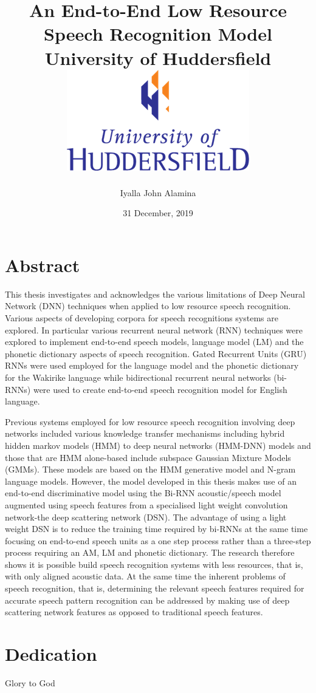 \documentclass[12pt,twoside]{report}
\title{
    {An End-to-End Low Resource Speech Recognition Model}\\
    {\large University of Huddersfield}\\
    {\includegraphics{university.png}}
}
\author{Iyalla John Alamina}
\date{31 December, 2019}
\begin{document}
\maketitle
{}

\chapter*{Abstract}
This thesis investigates and acknowledges the various limitations of Deep Neural Network (DNN) techniques when applied to low resource speech recognition.   Various aspects of developing corpora for speech recognitions systems are explored.  In particular various recurrent neural network (RNN) techniques were explored to implement end-to-end speech models, language model (LM) and the phonetic dictionary aspects of speech recognition. Gated Recurrent Units (GRU) RNNs were used employed for the language model and the phonetic dictionary for the Wakirike language while bidirectional recurrent neural networks (bi-RNNs) were used to create end-to-end speech recognition model for English language.

Previous systems employed for low resource speech recognition involving deep networks included various knowledge transfer mechanisms including hybrid hidden markov models (HMM) to deep neural networks (HMM-DNN) models and those that are HMM alone-based include subspace Gaussian Mixture Models (GMMs).   These models are based on the HMM generative model and N-gram language models.  However, the model developed in this thesis makes use of an end-to-end discriminative model using the Bi-RNN acoustic/speech model augmented using speech features from a specialised light weight convolution network-the deep scattering network (DSN).  The advantage of using a light weight DSN is to reduce the training time required by  bi-RNNs at the same time focusing on end-to-end speech units as a one step process rather than a three-step process requiring an AM, LM and phonetic dictionary. The research therefore shows it is possible build speech recognition systems with less resources, that is, with only aligned acoustic data.  At the same time the inherent problems of speech recognition, that is, determining the relevant speech features required for accurate speech pattern recognition can be addressed by making use of deep scattering network features as opposed to traditional speech features. 

\chapter*{Dedication}
Glory to God
\end{document}
